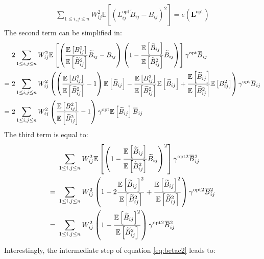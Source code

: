 \documentclass[12pt]{scrartcl}
\newcommand{\overbar}[1]{\mkern 1.5mu\overline{\mkern-1.5mu#1\mkern-1.5mu}\mkern 1.5mu}
\begin{document}
\begin{align}
\sum_{1 \le i,j \le n} W_{ij}^2 \mathbb{E} \left[\left(L^\mathrm{opt}_{ij} \widetilde{B}_{ij} - B_{ij} \right)^2 \right] = e(\mathbf{L}^\mathrm{opt})
\end{align}
The second term can be simplified in:
\begin{align}
& 2 \sum_{1 \le i,j \le n} W_{ij}^2 \mathbb{E} \left[\left(\frac{\mathbb{E} \left[B^2_{ij}\right]}{\mathbb{E} \left[\widetilde{B}_{ij}^2\right]} \widetilde{B}_{ij} - B_{ij}\right) \left(1 - \frac{\mathbb{E} \left[\widetilde{B}_{ij}\right]}{\mathbb{E} \left[\widetilde{B}_{ij}^2\right]} \widetilde{B}_{ij}\right)\right] \gamma^\mathrm{opt} \overbar{B}_{ij} \nonumber \\
= \ & 2 \sum_{1 \le i,j \le n} W_{ij}^2 \left(\left(\frac{\mathbb{E} \left[B^2_{ij}\right]}{\mathbb{E} \left[\widetilde{B}_{ij}^2\right]} - 1\right)  \mathbb{E} \left[\widetilde{B}_{ij}\right] - \frac{\mathbb{E} \left[B^2_{ij}\right]}{\mathbb{E} \left[\widetilde{B}_{ij}^2\right]} \mathbb{E} \left[\widetilde{B}_{ij}\right] + \frac{\mathbb{E} \left[\widetilde{B}_{ij}\right]}{\mathbb{E} \left[\widetilde{B}_{ij}^2\right]}  \mathbb{E} \left[B^2_{ij}\right]\right) \gamma^\mathrm{opt} \overbar{B}_{ij} \nonumber \\
= \ &  2 \sum_{1 \le i,j \le n} W_{ij}^2 \left(\frac{\mathbb{E} \left[B^2_{ij}\right]}{\mathbb{E} \left[\widetilde{B}_{ij}^2\right]}  - 1  \right) \gamma^\mathrm{opt} \mathbb{E} \left[\widetilde{B}_{ij}\right] \overbar{B}_{ij}
\end{align}
The third term is equal to:
\begin{align}
& \sum_{1 \le i,j \le n} W_{ij}^2 \mathbb{E} \left[ \left(1 - \frac{\mathbb{E} \left[\widetilde{B}_{ij}\right]}{\mathbb{E} \left[\widetilde{B}_{ij}^2\right]} \widetilde{B}_{ij}\right)^2\right] \gamma^{\mathrm{opt}2} \overbar{B}_{ij}^2 \nonumber \\
= \ & \sum_{1 \le i,j \le n} W_{ij}^2 \left(1 - 2 \frac{\mathbb{E} \left[\widetilde{B}_{ij}\right]^2}{\mathbb{E} \left[\widetilde{B}_{ij}^2\right]} + \frac{\mathbb{E} \left[\widetilde{B}_{ij}\right]^2}{\mathbb{E} \left[\widetilde{B}_{ij}^2\right]}\right) \gamma^{\mathrm{opt}2} \overbar{B}_{ij}^2 \nonumber \\
= \ & \sum_{1 \le i,j \le n} W_{ij}^2 \left(1 - \frac{\mathbb{E} \left[\widetilde{B}_{ij}\right]^2}{\mathbb{E}\left[ \widetilde{B}_{ij}^2 \right]}\right) \gamma^{\mathrm{opt}2} \overbar{B}_{ij}^2
\end{align}
Interestingly, the intermediate step of equation \eqref{eq:betac2} leads to:
\end{document}
